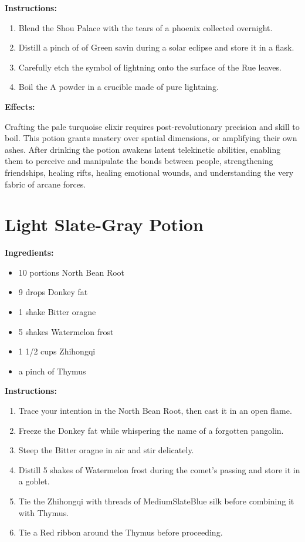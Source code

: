 \documentclass{article}
\begin{document}
\textbf{Instructions:}

\begin{enumerate}
  \item Blend the Shou Palace with the tears of a phoenix collected overnight.
  \item Distill a pinch of of Green savin during a solar eclipse and store it in a flask.
  \item Carefully etch the symbol of lightning onto the surface of the Rue leaves.
  \item Boil the A powder in a crucible made of pure lightning.
\end{enumerate}

\textbf{Effects:}

Crafting the pale turquoise elixir requires post-revolutionary precision and skill to boil. This potion grants mastery over spatial dimensions, or amplifying their own ashes. After drinking the potion awakens latent telekinetic abilities, enabling them to perceive and manipulate the bonds between people, strengthening friendships, healing rifts, healing emotional wounds, and understanding the very fabric of arcane forces.

\newpage
\section*{Light Slate-Gray Potion}

\textbf{Ingredients:}

\begin{itemize}
  \item 10 portions North Bean Root
  \item 9 drops Donkey fat
  \item 1 shake Bitter oragne
  \item 5 shakes Watermelon frost
  \item 1 1/2 cups Zhihongqi
  \item a pinch of Thymus
\end{itemize}

\textbf{Instructions:}

\begin{enumerate}
  \item Trace your intention in the North Bean Root, then cast it in an open flame.
  \item Freeze the Donkey fat while whispering the name of a forgotten pangolin.
  \item Steep the Bitter oragne in air and stir delicately.
  \item Distill 5 shakes of Watermelon frost during the comet’s passing and store it in a goblet.
  \item Tie the Zhihongqi with threads of MediumSlateBlue silk before combining it with Thymus.
  \item Tie a Red ribbon around the Thymus before proceeding.
\end{enumerate}
\end{document}
